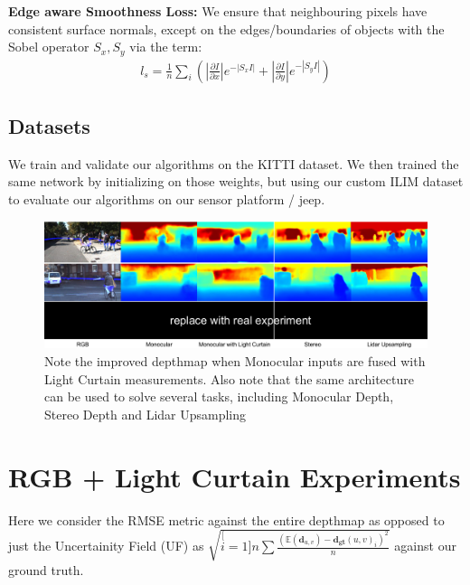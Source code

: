 \textbf{Edge aware Smoothness Loss:} We ensure that neighbouring pixels have consistent surface normals, except on the edges/boundaries of objects with the Sobel operator $S_{x}, S_{y}$ via the term:
\small
\begin{align}
    l_{s}=\frac{1}{n}\sum_{i}\left(\left|\frac{\partial I}{\partial x}\right|e^{-|S_{x}I|}+\left|\frac{\partial I}{\partial y}\right|e^{-|S_{y}I|}\right)
   \label{eq:smooth} 
\end{align}
\normalsize

\subsection{Datasets}

We train and validate our algorithms on the KITTI dataset. We then trained the same network by initializing on those weights, but using our custom ILIM dataset to evaluate our algorithms on our sensor platform / jeep.

\begin{figure}[h!]
   \includegraphics[width=1.0\textwidth]{figures/images.pdf}
   \caption{Note the improved depthmap when Monocular inputs are fused with Light Curtain measurements. Also note that the same architecture can be used to solve several tasks, including Monocular Depth, Stereo Depth and Lidar Upsampling}
   \label{fig:images2}
\end{figure}

\section{RGB + Light Curtain Experiments} 

Here we consider the RMSE metric against the entire depthmap as opposed to just the Uncertainity Field (UF) as $\sqrt{\stackrel[i=1]{n}{\sum}\frac{\left(\mathbb{E}\left(\mathbf{d}_{u,v}\right)-\mathbf{d_{gt}}(u,v)_{i}\right)^{2}}{n}}$ against our ground truth.

